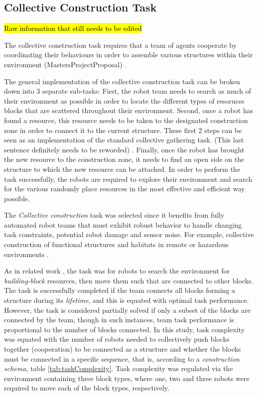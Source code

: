 \documentclass[conference]{IEEEtran}
\begin{document}
\subsection{Collective Construction Task}

\hl{Raw information that still needs to be edited}

The collective construction task requires that a team of agents cooperate by coordinating their behaviours in order to assemble various structures within their environment (MastersProjectProposal) \cite{RefWorks:15}.

The general implementation of the collective construction task can be broken down into 3 separate sub-tasks:
First, the robot team needs to search as much of their environment as possible in order to locate the different types of resoruces blocks that are scattered throughout their environment.
Second, once a robot has found a resource, this resource needs to be taken to the designated construction zone in order to connect it to the current structure. These first 2 steps can be seen as an implementation of the standard collective gathering task. (This last sentence definitely needs to be reworded) \cite{RefWorks15}.
Finally, once the robot has brought the new resource to the construction zone, it needs to find an open side on the structure to which the new resource can be attached.
In order to perform the task successfully, the robots are required to explore their environment and search for the various randomly place resources in the most effective and efficient way possible.

The \textit{Collective construction} task \cite{WerfelPetersenNagpal2014} was selected since it benefits
from fully automated robot teams that must exhibit robust behavior to handle changing task constraints,
potential robot damage and sensor noise.
For example, collective construction of functional structures and habitats in remote or hazardous
environments \cite{WerfelNagpal2008}.

As in related work \cite{WerfelPetersenNagpal2014}, the task was for robots to search the environment
for \textit{building-block} resources, then move them such that are connected to other blocks.
The task is successfully completed if the team connects all blocks forming a structure during its \textit{lifetime}, and this is equated
with optimal task performance.
However, the task is considered partially solved if only a subset of the blocks are connected by the team,
though in such instances, team task performance is proportional to the number of blocks connected.
In this study, task complexity was equated with the number of robots needed
to collectively push blocks together (cooperation) to be connected as a structure and whether the blocks
must be connected in a specific sequence, that is, according to a \textit{construction schema},
table \ref{tab:taskComplexity}.
Task complexity was regulated via the environment containing three block types, where one, two and three robots were required to move each of the block types, respectively.
\end{document}
